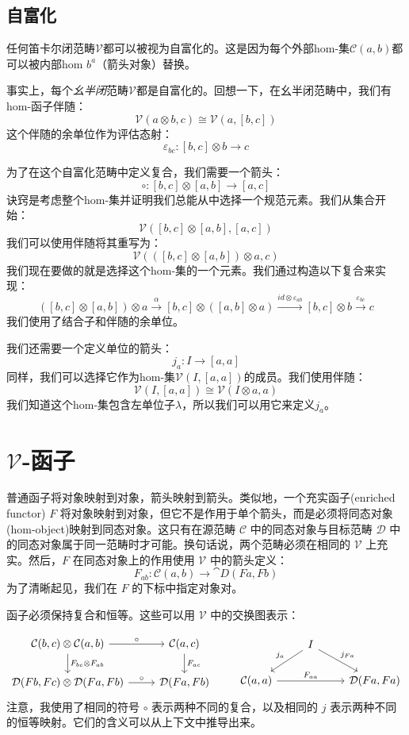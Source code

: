 \documentclass[DaoFP]{subfiles}
\begin{document}
\subsection{自富化}

任何笛卡尔闭范畴$\mathcal V$都可以被视为自富化的。这是因为每个外部hom-集$\mathcal C(a, b)$都可以被内部hom $b^a$（箭头对象）替换。

事实上，每个\emph{幺半闭}范畴$\mathcal V$都是自富化的。回想一下，在幺半闭范畴中，我们有hom-函子伴随：
\[ \mathcal V (a \otimes b, c) \cong \mathcal V (a, [b, c]) \]
这个伴随的余单位作为评估态射：
\[ \varepsilon_{b c} \colon [b, c] \otimes b \to c \]

为了在这个自富化范畴中定义复合，我们需要一个箭头：
\[ \circ \colon [b, c] \otimes [a, b] \to [a, c] \]
诀窍是考虑整个hom-集并证明我们总能从中选择一个规范元素。我们从集合开始：
\[ \mathcal V([b, c] \otimes [a, b], [a, c]) \]
我们可以使用伴随将其重写为：
\[  \mathcal V( ([b, c] \otimes [a, b]) \otimes a, c) \]
我们现在要做的就是选择这个hom-集的一个元素。我们通过构造以下复合来实现：
\[ ([b, c] \otimes [a, b]) \otimes a \xrightarrow{\alpha}  
    [b, c] \otimes ([a, b] \otimes a) \xrightarrow{id \otimes \varepsilon_{a b} }
    [b, c] \otimes b \xrightarrow{\varepsilon_{b c}} c \]
我们使用了结合子和伴随的余单位。

我们还需要一个定义单位的箭头：
\[ j_a \colon I \to [a, a] \]
同样，我们可以选择它作为hom-集$\mathcal V(I, [a, a])$的成员。我们使用伴随：
\[ \mathcal V(I, [a, a]) \cong \mathcal V (I \otimes a, a) \]
我们知道这个hom-集包含左单位子$\lambda$，所以我们可以用它来定义$j_a$。

\section{$\mathcal V$-函子}

普通函子将对象映射到对象，箭头映射到箭头。类似地，一个充实函子(enriched functor) $F$ 将对象映射到对象，但它不是作用于单个箭头，而是必须将同态对象(hom-object)映射到同态对象。这只有在源范畴 $\mathcal C$ 中的同态对象与目标范畴 $\mathcal D$ 中的同态对象属于同一范畴时才可能。换句话说，两个范畴必须在相同的 $\mathcal V$ 上充实。然后，$F$ 在同态对象上的作用使用 $\mathcal V$ 中的箭头定义：
\[ F_{a b} \colon \mathcal C (a, b) \to \cat D (F a, F b) \]
为了清晰起见，我们在 $F$ 的下标中指定对象对。

函子必须保持复合和恒等。这些可以用 $\mathcal V$ 中的交换图表示：

\[
 \begin{tikzcd}
 \mathcal C(b, c) \otimes \mathcal C(a, b) 
 \arrow[r, "\circ"]
 \arrow[d, "F_{b c} \otimes F_{a b}"]
 & \mathcal C(a, c)
 \arrow[d, "F_{a c}"]
 \\
 \mathcal D(F b, F c) \otimes \mathcal D (F a, F b)
 \arrow[r, "\circ"]
 & \mathcal D(F a, F b)
 \end{tikzcd}
 \qquad
 \begin{tikzcd}
 & I
 \arrow[dl, "j_a"']
 \arrow[dr, "j_{F a}"]
 \\
 \mathcal C(a, a)
 \arrow[rr, "F_{a a}"]
 && \mathcal D( F a, F a)
  \end{tikzcd}
\]
注意，我使用了相同的符号 $\circ$ 表示两种不同的复合，以及相同的 $j$ 表示两种不同的恒等映射。它们的含义可以从上下文中推导出来。
\end{document}
